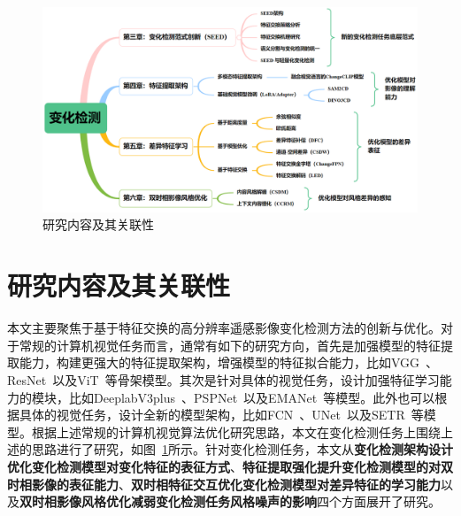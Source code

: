\begin{figure}[!htbp]
  \centering
  \includegraphics[width=\textwidth]{paper_figures/绪论/研究内容关联.png}
  \caption{研究内容及其关联性}
  \label{fig:research_content}
\end{figure}


\section{研究内容及其关联性}
本文主要聚焦于基于特征交换的高分辨率遥感影像变化检测方法的创新与优化。对于常规的计算机视觉任务而言，通常有如下的研究方向，首先是加强模型的特征提取能力，构建更强大的特征提取架构，增强模型的特征拟合能力，比如VGG~\cite{Simonyan2014VeryDC}、ResNet~\cite{He2015DeepRL}以及ViT~\cite{Dosovitskiy2020AnII}等骨架模型。其次是针对具体的视觉任务，设计加强特征学习能力的模块，比如DeeplabV3plus~\cite{chen2018encoder}、PSPNet~\cite{Zhao2016PyramidSP}以及EMANet~\cite{Li2019ExpectationMaximizationAN}等模型。此外也可以根据具体的视觉任务，设计全新的模型架构，比如FCN~\cite{Shelhamer2014FullyCN}、UNet~\cite{Ronneberger2015UNetCN}以及SETR~\cite{Zheng2020RethinkingSS}等模型。根据上述常规的计算机视觉算法优化研究思路，本文在变化检测任务上围绕上述的思路进行了研究，如图~\ref{fig:research_content}所示。针对变化检测任务，本文从\textbf{变化检测架构设计优化变化检测模型对变化特征的表征方式}、\textbf{特征提取强化提升变化检测模型的对双时相影像的表征能力}、\textbf{双时相特征交互优化变化检测模型对差异特征的学习能力}以及\textbf{双时相影像风格优化减弱变化检测任务风格噪声的影响}四个方面展开了研究。

